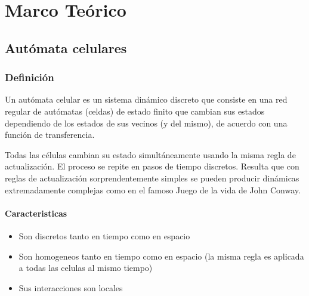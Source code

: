 \documentclass[12pt, fleqn]{report}                             %
\theoremstyle{break}                                            %
\begin{document}
\restoregeometry                                                    %
\nopagecolor                                                        %




\tableofcontents{}
\label{sec:Index}

\clearpage


\part{Marco Teórico}
\clearpage

  \chapter{Autómata celulares}

        \clearpage
        \section{Definición}

        Un autómata celular es un sistema dinámico discreto que consiste en una red regular
        de autómatas (celdas) de estado finito que cambian sus estados dependiendo de los estados de sus
        vecinos (y del mismo), de acuerdo con una función de transferencia. 
        
        Todas las células cambian su estado simultáneamente usando la misma regla de actualización. 
        El proceso se repite en pasos de tiempo discretos. 
        Resulta que con reglas de actualización sorprendentemente simples se pueden producir 
        dinámicas extremadamente complejas como en el famoso Juego de la vida de John Conway.  \cite{Kari}
        
      \subsection{Caracteristicas}
      \begin{itemize}
        \item Son discretos tanto en tiempo como en espacio
        \item Son homogeneos tanto en tiempo como en espacio 
        (la misma regla es aplicada a todas las celulas al mismo tiempo)
        \item Sus interacciones son locales
      \end{itemize}
\end{document}

